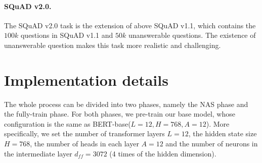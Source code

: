 \documentclass[letterpaper]{article} \usepackage{aaai22}  \usepackage{times}  \usepackage{helvet}  \usepackage{courier}  \usepackage[hyphens]{url}  \usepackage{graphicx} \urlstyle{rm} \def\UrlFont{\rm}  \usepackage{natbib}  \usepackage{caption} \DeclareCaptionStyle{ruled}{labelfont=normalfont,labelsep=colon,strut=off} \frenchspacing  \setlength{\pdfpagewidth}{8.5in}  \setlength{\pdfpageheight}{11in}  \usepackage{algorithm}
\begin{document}
\paragraph{SQuAD v2.0.}
The SQuAD v2.0 task is the extension of above SQuAD v1.1, which contains the $100k$ questions in SQuAD v1.1 and $50k$ unanswerable questions. The existence of unanswerable question makes this task more realistic and challenging. 



\begin{table}[h]
\vspace{-2mm}
\vspace{-3mm}
\begin{center}
\caption{Hyperparameters for pre-training.}\label{tab:pretrain_implementation_details}
\end{center}
\vspace{-5mm}
\end{table}


\section{Implementation details}

The whole process can be divided into two phases, namely the NAS phase and the fully-train phase. For both phases, we pre-train our base model, whose configuration is the same as BERT-base($L=12,H=768,A=12$). More specifically, we set the number of transformer layers $L=12$, the hidden state size $H=768$, the number of heads in each layer $A=12$ and the number of neurons in the intermediate layer $d_{ff}=3072$ (4 times of the hidden dimension).
\end{document}
